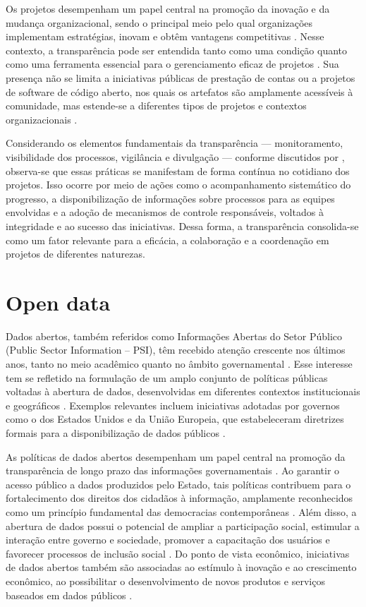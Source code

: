 Os projetos desempenham um papel central na promoção da inovação e da mudança organizacional, sendo o principal meio pelo qual organizações implementam estratégias, inovam e obtêm vantagens competitivas \cite{van20147}. Nesse contexto, a transparência pode ser entendida tanto como uma condição quanto como uma ferramenta essencial para o gerenciamento eficaz de projetos \cite{betta2018transparency}. Sua presença não se limita a iniciativas públicas de prestação de contas ou a projetos de software de código aberto, nos quais os artefatos são amplamente acessíveis à comunidade, mas estende-se a diferentes tipos de projetos e contextos organizacionais \cite{trois2017transparency, dabbish2012leveraging}.

Considerando os elementos fundamentais da transparência — monitoramento, visibilidade dos processos, vigilância e divulgação — conforme discutidos por \citeauthor{bernstein2017making}, observa-se que essas práticas se manifestam de forma contínua no cotidiano dos projetos. Isso ocorre por meio de ações como o acompanhamento sistemático do progresso, a disponibilização de informações sobre processos para as equipes envolvidas e a adoção de mecanismos de controle responsáveis, voltados à integridade e ao sucesso das iniciativas. Dessa forma, a transparência consolida-se como um fator relevante para a eficácia, a colaboração e a coordenação em projetos de diferentes naturezas.

\section{Open data}
Dados abertos, também referidos como Informações Abertas do Setor Público (Public Sector Information – PSI), têm recebido atenção crescente nos últimos anos, tanto no meio acadêmico quanto no âmbito governamental \cite{bertot2010using, bertot2012measurement}. Esse interesse tem se refletido na formulação de um amplo conjunto de políticas públicas voltadas à abertura de dados, desenvolvidas em diferentes contextos institucionais e geográficos \cite{civic_commons, huijboom2011open}. Exemplos relevantes incluem iniciativas adotadas por governos como o dos Estados Unidos e da União Europeia, que estabeleceram diretrizes formais para a disponibilização de dados públicos \cite{open_usa, initiative2018communication}.

As políticas de dados abertos desempenham um papel central na promoção da transparência de longo prazo das informações governamentais \cite{bertot2012measurement}. Ao garantir o acesso público a dados produzidos pelo Estado, tais políticas contribuem para o fortalecimento dos direitos dos cidadãos à informação, amplamente reconhecidos como um princípio fundamental das democracias contemporâneas \cite{allen}. Além disso, a abertura de dados possui o potencial de ampliar a participação social, estimular a interação entre governo e sociedade, promover a capacitação dos usuários e favorecer processos de inclusão social \cite{bertot2010using}. Do ponto de vista econômico, iniciativas de dados abertos também são associadas ao estímulo à inovação e ao crescimento econômico, ao possibilitar o desenvolvimento de novos produtos e serviços baseados em dados públicos \cite{borzacchiello2012impact}.


